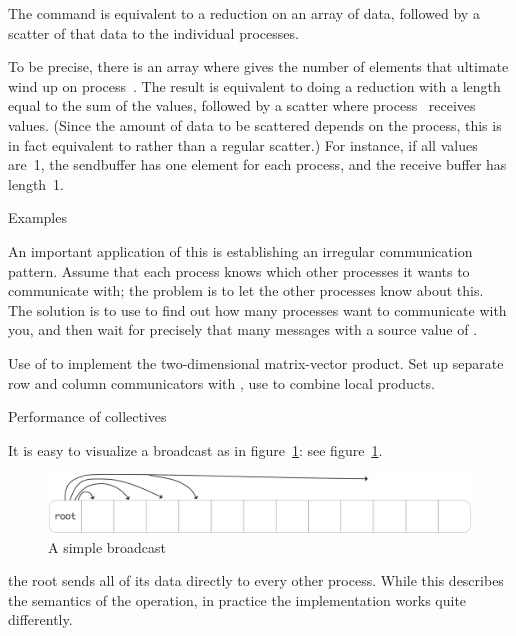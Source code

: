 The  command is equivalent to a reduction
on an array of data, followed by a scatter of that data to the individual processes.

To be precise, there is an array  where  gives
the number of elements that ultimate wind up on process~.
The result is equivalent to doing a reduction with a length equal to the sum
of the  values, followed by a scatter where process~
receives  values. (Since the amount of data to be scattered
depends on the process, this is in fact equivalent to 
rather than a regular scatter.)
%
%
For instance, if all  values are~1, the sendbuffer has one element
for each process, and the receive buffer has length~1.

 {Examples}

An important application of this is establishing an irregular
communication pattern.  Assume that each process knows which
other processes it wants to communicate with; the problem is to
let the other processes know about this.
The solution is to use  to find out how many processes
want to communicate with you, and then wait for precisely that many messages
with a source value of .

Use of  to implement the two-dimensional
matrix-vector product.
Set up separate row and column communicators with
, use  to combine
local products.
%

 {Performance of collectives}

It is easy to visualize a broadcast as in figure~\ref{fig:bcast-simple}:
see figure~\ref{fig:bcast-simple}.
\begin{figure}[ht]
  \includegraphics[scale=.08]{graphics/bcast-simple}
  \caption{A simple broadcast}
  \label{fig:bcast-simple}
\end{figure}
the root sends all of its data directly to every other process.
While this describes the semantics of the operation, in practice
the implementation works quite differently.

